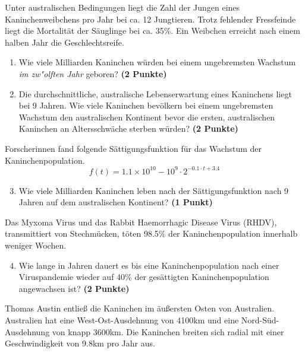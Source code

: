 \documentclass[a4paper, 10pt]{scrartcl}\usepackage[]{graphicx}\usepackage[]{xcolor}
\begin{document}
Unter australischen Bedingungen liegt die Zahl der Jungen eines
Kaninchenweibchens pro Jahr bei ca. 12 Jungtieren. Trotz
fehlender Fressfeinde liegt die Mortalit{\"a}t der S{\"a}uglinge bei
ca. 35\%. Ein Weibchen erreicht nach einem halben Jahr die
Geschlechtsreife.

\begin{enumerate}
\item Wie viele Milliarden Kaninchen w{\"u}rden bei einem ungebremsten
  Wachstum \textit{im zw{"o}lften Jahr} geboren? \textbf{(2 Punkte)}
\item Die durchschnittliche, australische Lebenserwartung eines Kaninchens
  liegt bei 9 Jahren. Wie viele Kaninchen bev{\"o}lkern bei einem
  ungebremsten Wachstum den australischen Kontinent bevor die ersten,
  australischen Kaninchen an Altersschw{\"a}che sterben w{\"u}rden? \textbf{(2
    Punkte)}
\end{enumerate}

Forscherinnen fand folgende S{\"a}ttigungsfunktion f{\"u}r das Wachstum der
Kaninchenpopulation.
\begin{equation*}
  f(t) = \ensuremath{1.1\times 10^{10}} - \ensuremath{10^{9}} \cdot 2^{-0.1 \cdot t + 3.4}
\end{equation*}

\begin{enumerate}
  \setcounter{enumi}{2}
\item Wie viele Milliarden Kaninchen leben nach der S{\"a}ttigungsfunktion
  nach 9 Jahren auf dem australischen Kontinent? \textbf{(1
    Punkt)}
\end{enumerate}

Das Myxoma Virus und das Rabbit Haemorrhagic Disease Virus (RHDV),
transmittiert von Stechm{\"u}cken, t{\"o}ten 98.5\% der
Kaninchenpopulation innerhalb weniger Wochen. 

\begin{enumerate}
  \setcounter{enumi}{3}  
\item Wie lange in Jahren dauert es bis eine Kaninchenpopulation nach einer
  Viruspandemie wieder auf 40\% der ges{\"a}ttigten
  Kaninchenpopulation angewachsen ist?  \textbf{(2 Punkte)}
\end{enumerate}

Thomas Austin entlie{\ss} die Kaninchen im {\"a}u{\ss}ersten Osten von
Australien. Australien hat eine West-Ost-Ausdehnung von 4100km
und eine Nord-S{\"u}d-Ausdehnung von knapp 3600km. Die Kaninchen
breiten sich radial mit einer Geschwindigkeit von 9.8km pro
Jahr aus.
\end{document}
